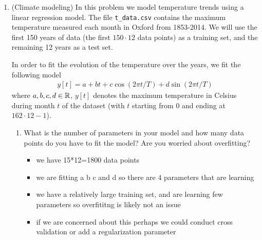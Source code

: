 \documentclass[12pt,twoside]{article}
\begin{document}
\begin{enumerate}
\begin{itemize}
\begin{enumerate}
    \end{enumerate}
\end{itemize}

\newpage
\item  (Climate modeling) In this problem we model temperature trends using a linear regression model. The file 
\texttt{t\_data.csv} contains the maximum temperature measured
  each month in Oxford from 1853-2014.  We will use the first
  150 years of data (the first $150\cdot 12$ data points) as a training set, and
  the remaining 12 years as a test set.

 In order to fit the evolution of the temperature over the years, we fit the following model
  \begin{align}
  y[t] = a + bt + c \cos(2\pi t/T) + d\sin(2\pi  t/T)
  \end{align}
  where $a,b,c,d\in\mathbb{R}$, $y[t]$ denotes the maximum temperature in Celsius during month $t$ of the dataset (with $t$ starting from $0$ and ending at $162\cdot 12-1$).
   
  \begin{enumerate}
  \item What is the number of parameters in your model and how many data points do you have to fit the model? Are you worried about overfitting?
\begin{itemize}
    \color{blue}
    \item we have 15*12=1800 data points 
    \item we are fitting a b c and d so there are 4 parameters that are learning 
    \item we have a relatively large training set, and are learning few parameters so overfititng is likely not an issue 
    \item if we are concerned about this perhaps we could conduct cross validation or add a regularization parameter 
\end{itemize}
  

\end{enumerate}
\end{enumerate}
\end{document}
